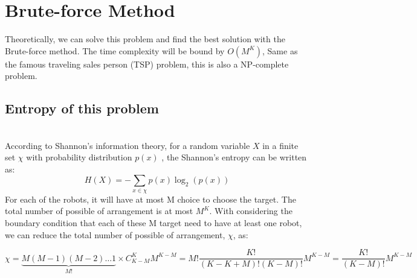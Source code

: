 \section{Brute-force Method}
Theoretically, we can solve this problem and find the best solution with the Brute-force method. The time complexity will be bound by $O(M^K)$, Same as the famous traveling sales person (TSP) problem, this is also a NP-complete problem.
\subsection{Entropy of this problem}
\\ According to Shannon's information theory\cite{Shannon1948}, for a random variable $X$ in a finite set $\chi$ with probability distribution $p(x)$ , the  Shannon's entropy can be written as:
\begin{equation}
    H\left( X \right) =  - \sum\limits_{x \in \chi } {p\left( x \right){{\log }_2}\left( {p\left( x \right)} \right)}\label{shannon}
\end{equation}
For each of the robots, it will have at most M choice to choose the target. The total number of possible of arrangement is at most $M^K$. With considering the boundary condition that each of these M target need to have at least one robot, we can reduce the total number of possible of arrangement, $\chi$, as: 

\begin{equation}
\chi  = \underbrace {M\left( {M - 1} \right)\left( {M - 2} \right) \ldots 1}_{M!} \times C_{K - M}^K{M^{K - M}} = M!\frac{{K!}}{{\left( {K - K + M} \right)!\left( {K - M} \right)!}}{M^{K - M}} = \frac{{K!}}{{\left( {K - M} \right)!}}{M^{K - M}}
\end{equation}